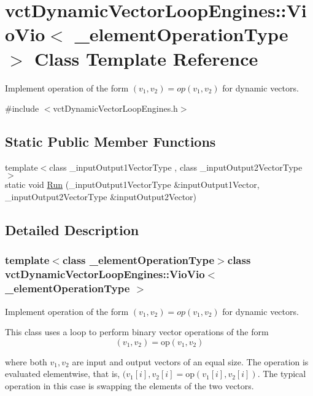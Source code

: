 \hypertarget{classvct_dynamic_vector_loop_engines_1_1_vio_vio}{}\section{vct\+Dynamic\+Vector\+Loop\+Engines\+:\+:Vio\+Vio$<$ \+\_\+element\+Operation\+Type $>$ Class Template Reference}
\label{classvct_dynamic_vector_loop_engines_1_1_vio_vio}


Implement operation of the form $(v_{1}, v_{2}) = op(v_{1}, v_{2})$ for dynamic vectors.  




{\ttfamily \#include $<$vct\+Dynamic\+Vector\+Loop\+Engines.\+h$>$}

\subsection*{Static Public Member Functions}
\begin{DoxyCompactItemize}
\item 
{\footnotesize template$<$class \+\_\+input\+Output1\+Vector\+Type , class \+\_\+input\+Output2\+Vector\+Type $>$ }\\static void \hyperlink{classvct_dynamic_vector_loop_engines_1_1_vio_vio_a68c04111eec38d9a4f0d6c416e65540b}{Run} (\+\_\+input\+Output1\+Vector\+Type \&input\+Output1\+Vector, \+\_\+input\+Output2\+Vector\+Type \&input\+Output2\+Vector)
\end{DoxyCompactItemize}


\subsection{Detailed Description}
\subsubsection*{template$<$class \+\_\+element\+Operation\+Type$>$class vct\+Dynamic\+Vector\+Loop\+Engines\+::\+Vio\+Vio$<$ \+\_\+element\+Operation\+Type $>$}

Implement operation of the form $(v_{1}, v_{2}) = op(v_{1}, v_{2})$ for dynamic vectors. 

This class uses a loop to perform binary vector operations of the form \[ (v_{1}, v_{2}) = \mathrm{op}(v_{1}, v_{2}) \]

where both $v_{1}, v_{2}$ are input and output vectors of an equal size. The operation is evaluated elementwise, that is, $(v_{1}[i], v_{2}[i] = \mathrm{op}(v_{1}[i], v_{2}[i])$. The typical operation in this case is swapping the elements of the two vectors.


